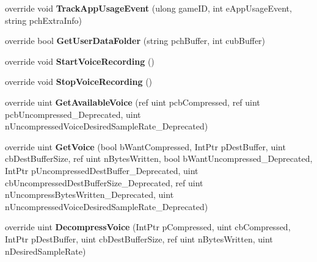 \begin{DoxyCompactItemize}
override void {\bfseries Track\+App\+Usage\+Event} (ulong game\+ID, int e\+App\+Usage\+Event, string pch\+Extra\+Info)
\item 
\mbox{\label{class_valve_1_1_steamworks_1_1_c_steam_user_a662b9e336f3ac5ba1432de76e1defc72}} 
override bool {\bfseries Get\+User\+Data\+Folder} (string pch\+Buffer, int cub\+Buffer)
\item 
\mbox{\label{class_valve_1_1_steamworks_1_1_c_steam_user_a317a656c6f517478ad5e8b8849e9451f}} 
override void {\bfseries Start\+Voice\+Recording} ()
\item 
\mbox{\label{class_valve_1_1_steamworks_1_1_c_steam_user_aaaa40d7ed3e5782685fa82e65aa7349a}} 
override void {\bfseries Stop\+Voice\+Recording} ()
\item 
\mbox{\label{class_valve_1_1_steamworks_1_1_c_steam_user_a4e73fee9b69d4d6b66e16a105d869262}} 
override uint {\bfseries Get\+Available\+Voice} (ref uint pcb\+Compressed, ref uint pcb\+Uncompressed\+\_\+\+Deprecated, uint n\+Uncompressed\+Voice\+Desired\+Sample\+Rate\+\_\+\+Deprecated)
\item 
\mbox{\label{class_valve_1_1_steamworks_1_1_c_steam_user_aae3486a6c64e431811b57dde4a5fe0dc}} 
override uint {\bfseries Get\+Voice} (bool b\+Want\+Compressed, Int\+Ptr p\+Dest\+Buffer, uint cb\+Dest\+Buffer\+Size, ref uint n\+Bytes\+Written, bool b\+Want\+Uncompressed\+\_\+\+Deprecated, Int\+Ptr p\+Uncompressed\+Dest\+Buffer\+\_\+\+Deprecated, uint cb\+Uncompressed\+Dest\+Buffer\+Size\+\_\+\+Deprecated, ref uint n\+Uncompress\+Bytes\+Written\+\_\+\+Deprecated, uint n\+Uncompressed\+Voice\+Desired\+Sample\+Rate\+\_\+\+Deprecated)
\item 
\mbox{\label{class_valve_1_1_steamworks_1_1_c_steam_user_ac7468e07cdbd3ddb4965e296023a3164}} 
override uint {\bfseries Decompress\+Voice} (Int\+Ptr p\+Compressed, uint cb\+Compressed, Int\+Ptr p\+Dest\+Buffer, uint cb\+Dest\+Buffer\+Size, ref uint n\+Bytes\+Written, uint n\+Desired\+Sample\+Rate)
\item 
\mbox{\label{class_valve_1_1_steamworks_1_1_c_steam_user_a94685c26852ffaf27f904b5ee918d7ee}} 

\end{DoxyCompactItemize}
